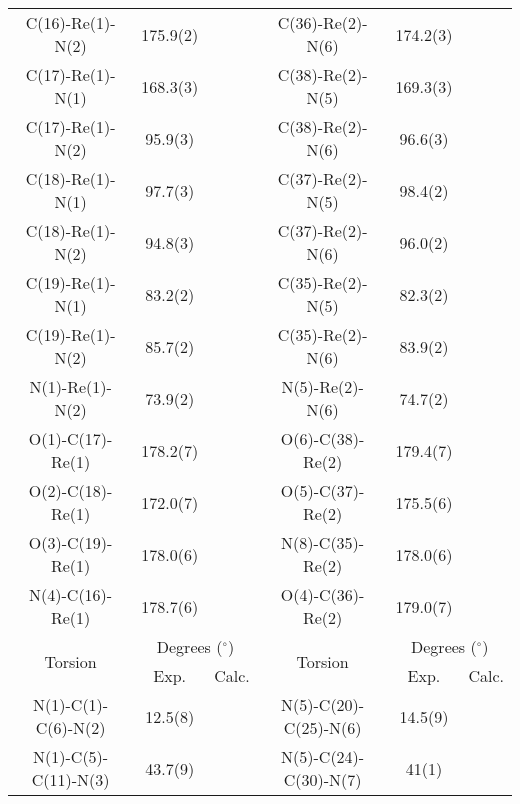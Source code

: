 \begin{table}[htbp]
\begin{tabular}{cccccc}
    C(16)-Re(1)-N(2) & 175.9(2) & & C(36)-Re(2)-N(6) & 174.2(3) & \\
    C(17)-Re(1)-N(1) & 168.3(3) & & C(38)-Re(2)-N(5) & 169.3(3) & \\
    C(17)-Re(1)-N(2) & 95.9(3) & & C(38)-Re(2)-N(6) & 96.6(3) & \\
    C(18)-Re(1)-N(1) & 97.7(3) & & C(37)-Re(2)-N(5) & 98.4(2) & \\
    C(18)-Re(1)-N(2) & 94.8(3) & & C(37)-Re(2)-N(6) & 96.0(2) & \\
    C(19)-Re(1)-N(1) & 83.2(2) & & C(35)-Re(2)-N(5) & 82.3(2) & \\
    C(19)-Re(1)-N(2) & 85.7(2) & & C(35)-Re(2)-N(6) & 83.9(2) & \\
    N(1)-Re(1)-N(2) & 73.9(2) & & N(5)-Re(2)-N(6) & 74.7(2) & \\
    O(1)-C(17)-Re(1) & 178.2(7) & & O(6)-C(38)-Re(2) & 179.4(7) & \\
    O(2)-C(18)-Re(1) & 172.0(7)& & O(5)-C(37)-Re(2) & 175.5(6) & \\ 
    O(3)-C(19)-Re(1) & 178.0(6) & & N(8)-C(35)-Re(2) & 178.0(6) & \\
    N(4)-C(16)-Re(1) & 178.7(6) & & O(4)-C(36)-Re(2) & 179.0(7) & \\ \midrule
    \multirow{2}{*}{Torsion} & \multicolumn{2}{c}{Degrees ($^\circ$)} & \multirow{2}{*}{Torsion} & \multicolumn{2}{c}{Degrees ($^\circ$)} \\ \cline{2-3} \cline {5-6}
     & Exp. & Calc. & & Exp. & Calc. \\ \midrule
    N(1)-C(1)-C(6)-N(2) & 12.5(8) & & N(5)-C(20)-C(25)-N(6) & 14.5(9) & \\
    N(1)-C(5)-C(11)-N(3) & 43.7(9) & & N(5)-C(24)-C(30)-N(7) & 41(1) & \\
    \bottomrule
    \end{tabular}%
  \label{tab.da5}%
\end{table}%


